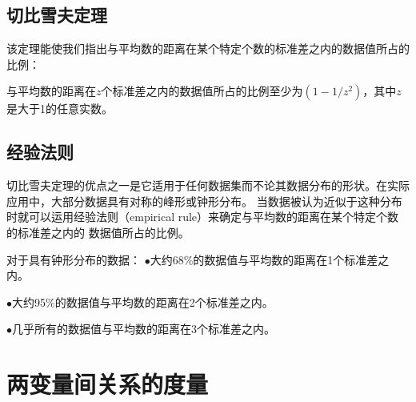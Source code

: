 \documentclass[a4paper]{ctexrep}
\begin{document}
\subsection{切比雪夫定理}
该定理能使我们指出与平均数的距离在某个特定个数的标准差之内的数据值所占的比例：

与平均数的距离在$z$个标准差之内的数据值所占的比例至少为$(1-1/z^{2})$，其中$z$是大于1的任意实数。

\subsection{经验法则}
切比雪夫定理的优点之一是它适用于任何数据集而不论其数据分布的形状。在实际应用中，大部分数据具有对称的峰形或钟形分布。
当数据被认为近似于这种分布时就可以运用经验法则（empirical rule）来确定与平均数的距离在某个特定个数的标准差之内的
数据值所占的比例。
\begin{tcolorbox}[title = {经验法则}]
对于具有钟形分布的数据：
\tcblower
$\bullet$大约68\%的数据值与平均数的距离在1个标准差之内。

$\bullet$大约95\%的数据值与平均数的距离在2个标准差之内。

$\bullet$几乎所有的数据值与平均数的距离在3个标准差之内。
\end{tcolorbox}


\section{两变量间关系的度量}
\end{document}
